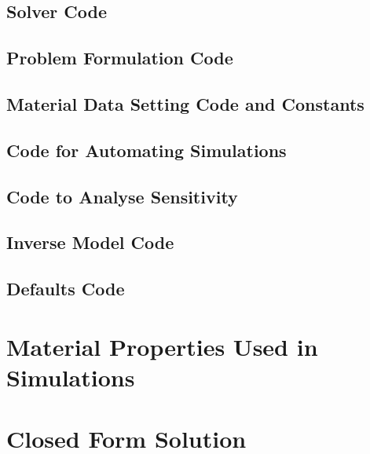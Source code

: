 \documentclass[MTech]{iitmdiss}
\begin{document}
\section{Solver Code}

\pagebreak
\section{Problem Formulation Code}

\pagebreak
\section{Material Data Setting Code and Constants}


\pagebreak
\section{Code for Automating Simulations}

\pagebreak
\section{Code to Analyse Sensitivity}

\pagebreak
\section{Inverse Model Code}

\pagebreak
\section{Defaults Code}

\pagebreak
\chapter{Material Properties Used in Simulations}
%  	
%	
\chapter{Closed Form Solution}
\begin{thebibliography}{9}

\end{thebibliography}
\end{document}

